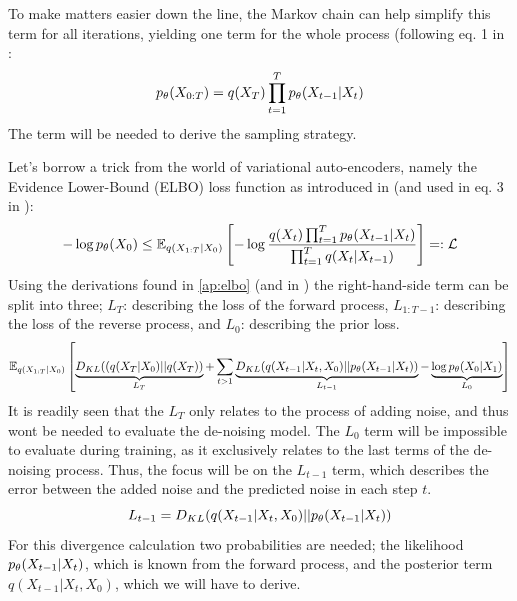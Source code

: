 To make matters easier down the line, the Markov chain can help simplify this term for all iterations, yielding one term for the whole process (following eq. 1 in \cite{ddpm}:
\begin{equation}
    p_{\theta} (X_{0:T}) = q(X_T) \prod_{t=1}^T p_{\theta} (X_{t-1}|X_t)
\end{equation}
The term will be needed to derive the sampling strategy.

Let's borrow a trick from the world of variational auto-encoders, namely the Evidence Lower-Bound (ELBO) loss function as introduced in \cite{vae} (and used in eq. 3 in \cite{ddpm}):
\begin{equation} \label{eq:elbo}
    -\log p_{\theta} (X_0) \leq \mathbb{E}_{q(X_{1:T}|X_0)} \left[ -\log \frac{q(X_t) \prod_{t=1}^T p_{\theta} (X_{t-1}|X_t)}{\prod_{t=1}^T q(X_t|X_{t-1})} \right] =: \mathcal{L}
\end{equation}
Using the derivations found in \autoref{ap:elbo} (and in \cite{ddpm}) the right-hand-side term can be split into three; $L_T$: describing the loss of the forward process, $L_{1:T-1}$: describing the loss of the reverse process, and $L_0$: describing the prior loss.
\begin{equation} \label{eq:dl-convergence}
    \mathbb{E}_{q(X_{1:T}|X_0)} 
    \left[ 
        \underbrace{ D_{KL} ( (q(X_T|X_0) || q(X_T)) }_{L_T} +
        \sum_{t>1} \underbrace{ D_{KL} ( q(X_{t-1} | X_t, X_0) || p_{\theta}(X_{t-1}|X_t) ) }_{L_{t-1}} -
        \underbrace{ \log p_{\theta} (X_0|X_1) }_{L_0}
    \right]
\end{equation}
It is readily seen that the $L_T$ only relates to the process of adding noise, and thus wont be needed to evaluate the de-noising model. The $L_0$ term will be impossible to evaluate during training, as it exclusively relates to the last terms of the de-noising process. Thus, the focus will be on the $L_{t-1}$ term, which describes the error between the added noise and the predicted noise in each step $t$.
\begin{equation}
    L_{t-1} = D_{KL} ( q(X_{t-1} | X_t, X_0) || p_{\theta}(X_{t-1}|X_t) )
\end{equation}
For this divergence calculation two probabilities are needed; the likelihood $p_{\theta}(X_{t-1}|X_t)$, which is known from the forward process, and the posterior term $q(X_{t-1} | X_t, X_0)$, which we will have to derive.

